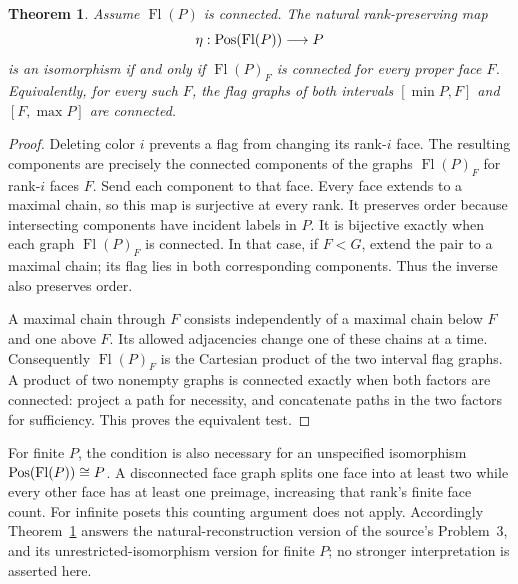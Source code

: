 \documentclass[a4paper,11pt]{article}
\newtheorem{theorem}{Theorem}\newtheorem{lemma}[theorem]{Lemma}
\newcommand{\Fl}{\operatorname{Fl}}\newcommand{\gen}[1]{\langle#1\rangle}
\begin{document}
\begin{theorem}\label{reconstruction}
Assume $\Fl(P)$ is connected. The natural rank-preserving map
\[
 \eta:\Pos(\Fl(P))\longrightarrow P
\]
is an isomorphism if and only if $\Fl(P)_F$ is connected for every
proper face $F$. Equivalently, for every such $F$, the flag graphs
of both intervals $[\min P,F]$ and $[F,\max P]$ are connected.
\end{theorem}
\begin{proof}
Deleting color $i$ prevents a flag from changing its rank-$i$ face.
The resulting components are precisely the connected components of
the graphs $\Fl(P)_F$ for rank-$i$ faces $F$. Send each component
to that face. Every face extends to a maximal chain, so this map
is surjective at every rank. It preserves order because intersecting
components have incident labels in $P$. It is bijective exactly when
each graph $\Fl(P)_F$ is connected. In that case, if $F<G$, extend
the pair to a maximal chain; its flag lies in both corresponding
components. Thus the inverse also preserves order.

A maximal chain through $F$ consists independently of a maximal
chain below $F$ and one above $F$. Its allowed adjacencies change
one of these chains at a time. Consequently $\Fl(P)_F$ is the
Cartesian product of the two interval flag graphs. A product of
two nonempty graphs is connected exactly when both factors are
connected: project a path for necessity, and concatenate paths in
the two factors for sufficiency. This proves the equivalent test.
\end{proof}

For finite $P$, the condition is also necessary for an unspecified
isomorphism $\Pos(\Fl(P))\cong P$. A disconnected face
graph splits one face into at least two while every other face has
at least one preimage, increasing that rank's finite face count.
For infinite posets this counting argument does not apply. Accordingly
Theorem~\ref{reconstruction} answers the natural-reconstruction version
of the source's Problem~3, and its unrestricted-isomorphism version
for finite $P$; no stronger interpretation is asserted here.
\end{document}
